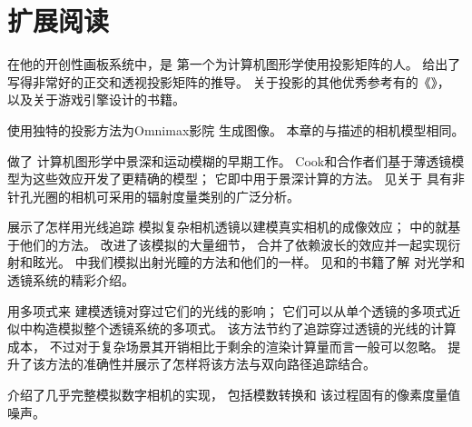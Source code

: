 \section{扩展阅读}\label{sec:扩展阅读06}

在他的开创性画板系统中，\citet{10.1145/1461551.1461591}是
第一个为计算机图形学使用投影矩阵的人。
\citet{10.1201/9781315365459}给出了
写得非常好的正交和透视投影矩阵的推导。
关于投影的其他优秀参考有\citet{10.5555/63448}的《》，
以及\citet{EBERLY2007}关于游戏引擎设计的书籍。

\citet{4056910}使用独特的投影方法为Omnimax\textsuperscript{\textregistered}影院
生成图像。
本章的与\citet{KENTON1992288}描述的相机模型相同。

\citet{10.1145/800224.806818,10.1145/357299.357300,10.1145/800059.801169}做了
计算机图形学中景深和运动模糊的早期工作。
Cook和合作者们基于薄透镜模型为这些效应开发了更精确的模型；
它即中用于景深计算的方法\citep{10.1145/800031.808590,10.1145/7529.8927}。
见\citet{10.2312:EGWR:EGSR07:121-126}关于
具有非针孔光圈的相机可采用的辐射度量类别的广泛分析。

\citet{10.1145/218380.218463}展示了怎样用光线追踪
模拟复杂相机透镜以建模真实相机的成像效应；
中的就基于他们的方法。
\citet{10.1111/j.1467-8659.2011.01851.x}改进了该模拟的大量细节，
合并了依赖波长的效应并一起实现衍射和眩光。
中我们模拟出射光瞳的方法和他们的一样。
见\citet{0321188780}和\citet{9780071476874}的书籍了解
对光学和透镜系统的精彩介绍。

\citet{10.1111/j.1467-8659.2012.03132.x}用多项式来
建模透镜对穿过它们的光线的影响；
它们可以从单个透镜的多项式近似中构造模拟整个透镜系统的多项式。
该方法节约了追踪穿过透镜的光线的计算成本，
不过对于复杂场景其开销相比于剩余的渲染计算量而言一般可以忽略。
\citet{10.1111/cgf.12301}提升了该方法的准确性并展示了怎样将该方法与双向路径追踪结合。

\citet{5280315}介绍了几乎完整模拟数字相机的实现，
包括模数转换和
该过程固有的像素度量值噪声。